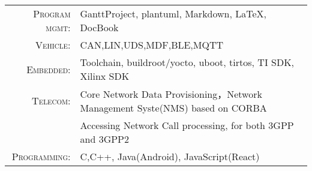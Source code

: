 %
%


 
\renewcommand{\arraystretch}{1.1}

	\begin{tabular}{>{}r>{}p{13cm}} 
		\textsc{Program mgmt:}	   & GanttProject, plantuml, Markdown, LaTeX, DocBook \\
		\textsc{Vehicle:}	   & CAN,LIN,UDS,MDF,BLE,MQTT \\
		\textsc{Embedded:}	   & Toolchain, buildroot/yocto, uboot, tirtos, TI SDK, Xilinx SDK  \\		
		\textsc{Telecom:} 		   & Core Network Data Provisioning，Network Management Syste(NMS) based on CORBA\\
							   & Accessing Network Call processing, for both 3GPP and 3GPP2 \\
		\textsc{Programming:}      & C,C++, Java(Android), JavaScript(React)\\
	\end{tabular}
	
